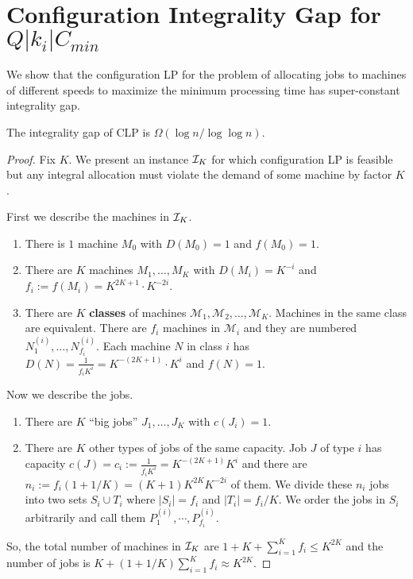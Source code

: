 \documentclass{article}[11pt]
\begin{document}
\section{Configuration Integrality Gap for $Q|k_i|C_{min}$}
We show that the configuration LP for the problem of allocating jobs to machines of different speeds to maximize the minimum processing time has super-constant integrality gap.
\begin{theorem}
	The integrality gap of CLP is $\Omega(\log n/\log\log n)$.
\end{theorem}
\begin{proof}
\def\M{\mathcal{M}}
Fix $K$. We present an instance ${\cal I}_K$ for which configuration LP is feasible but any integral allocation must violate the demand of some machine by factor $K$.

First we describe the machines in ${\cal I}_K$.
\begin{enumerate}
	\item There is $1$ machine $M_0$ with $D(M_0) = 1$ and $f(M_0) = 1$.
	\item There are $K$ machines $M_1,\ldots,M_K$ with $D(M_i) = K^{-i}$ and $f_i := f(M_i) = K^{2K + 1}\cdot K^{-2i}$.
	\item There are $K$ {\bf classes} of machines $\M_1,\M _2,\ldots, \M _K$. Machines in the same class are equivalent. 
	There are $f_i$ machines in $\M_i$ and they are numbered $N^{(i)}_1,\ldots,N^{(i)}_{f_i}$.
Each machine $N$  in class $i$ has $D(N) = \frac{1}{f_iK^i} = K^{-(2K+ 1)}\cdot K^i$ and $f(N) = 1$.
\end{enumerate}
Now we describe the jobs.
\begin{enumerate}
	\item There are $K$ ``big jobs'' $J_1,\ldots,J_K$ with $c(J_i) = 1$.
	\item There are $K$ other types of jobs of the same capacity. Job $J$ of type $i$ has capacity $c(J) = c_i :=  \frac{1}{f_iK^i} = K^{-(2K+1)}K^i$  and there are $n_i := f_i (1+1/K) = (K+1)K^{2K}K^{-2i}$ of them.
	We divide these $n_i$ jobs into two sets $S_i \cup T_i$ where $|S_i| = f_i$ and $|T_i| = f_i/K$. We order the jobs in $S_i$ arbitrarily and call them $P^{(i)}_1,\cdots,P^{(i)}_{f_i}$.
\end{enumerate}
So, the total number of machines in ${\cal I}_K$ are $1 + K + \sum_{i=1}^K f_i  \leq K^{2K}$ and the number of jobs is $K + (1+1/K)\sum_{i=1}^K f_i \approx K^{2K}$. 


\end{proof}
\end{document}
